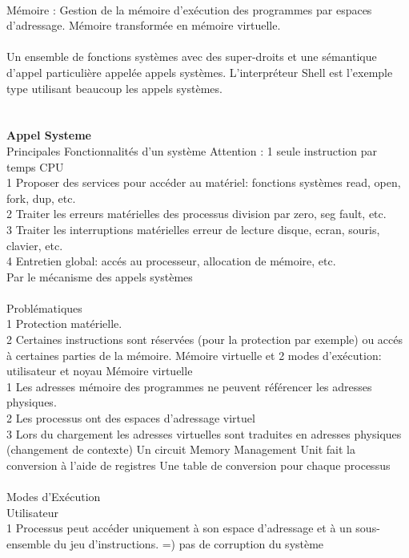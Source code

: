 \documentclass[5pt]{article}
\begin{document}
\begin{scriptsize}
\\
Mémoire : Gestion de la mémoire d’exécution des programmes par espaces d’adressage. Mémoire transformée en mémoire virtuelle.\\
\\
Un ensemble de fonctions systèmes avec des super-droits et une sémantique d’appel particulière appelée appels systèmes. L’interpréteur Shell est l’exemple type utilisant beaucoup les appels systèmes.\\
\\\\
\textbf{Appel Systeme}\\
Principales Fonctionnalités d’un système
Attention : 1 seule instruction par temps CPU\\
1 Proposer des services pour accéder au matériel: fonctions systèmes read, open, fork, dup, etc.\\
2 Traiter les erreurs matérielles des processus division par zero, seg fault, etc.\\
3 Traiter les interruptions matérielles erreur de lecture disque, ecran, souris, clavier, etc.\\
4 Entretien global: accés au processeur, allocation de mémoire, etc.\\
Par le mécanisme des appels systèmes\\
\\
Problématiques\\
1 Protection matérielle.\\
2 Certaines instructions sont réservées (pour la protection par exemple) ou accés à certaines parties de la mémoire.
Mémoire virtuelle et 2 modes d’exécution: utilisateur et noyau
Mémoire virtuelle\\
1 Les adresses mémoire des programmes ne peuvent référencer les adresses physiques.\\
2 Les processus ont des espaces d’adressage virtuel\\
3 Lors du chargement les adresses virtuelles sont traduites en adresses physiques (changement de contexte) Un circuit Memory Management Unit fait la conversion à l’aide de registres Une table de conversion pour chaque processus\\
\\
Modes d’Exécution\\
Utilisateur\\
1 Processus peut accéder uniquement à son espace d’adressage et à un sous-ensemble du jeu d’instructions. =) pas de corruption du système\\

\end{scriptsize}
\end{document}
